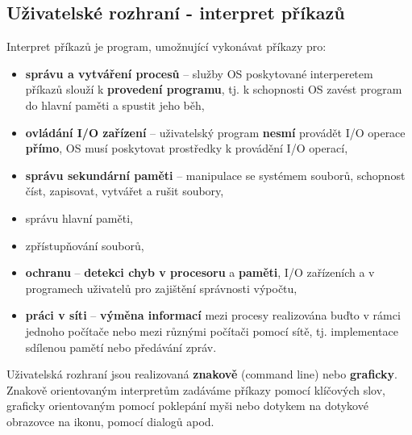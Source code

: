 \subsection{Uživatelské rozhraní - interpret příkazů}
Interpret příkazů je program, umožnující vykonávat příkazy pro:
\begin{itemize}
    \item \textbf{správu a vytváření procesů} -- služby OS poskytované interperetem příkazů slouží k \textbf{provedení programu}, tj. k schopnosti OS zavést program do hlavní paměti a spustit jeho běh,
    \item \textbf{ovládání I/O zařízení} -- uživatelský program \textbf{nesmí} provádět I/O operace \textbf{přímo}, OS musí poskytovat prostředky k provádění I/O operací,
    \item \textbf{správu sekundární paměti} -- manipulace se systémem souborů, schopnost číst, zapisovat, vytvářet a rušit soubory,
    \item správu hlavní paměti,
    \item zpřístupňování souborů,
    \item \textbf{ochranu} -- \textbf{detekci chyb v procesoru} a \textbf{paměti}, I/O zařízeních a v programech uživatelů pro zajištění správnosti výpočtu,
    \item \textbf{práci v síti} -- \textbf{výměna informací} mezi procesy realizována buďto v rámci jednoho počítače nebo mezi různými počítači pomocí sítě, tj. implementace sdílenou pamětí nebo předávání zpráv.
\end{itemize}
Uživatelská rozhraní jsou realizovaná \textbf{znakově} (command line) nebo \textbf{graficky}. Znakově orientovaným interpretům zadáváme příkazy pomocí klíčových slov, graficky orientovaným pomocí poklepání myši nebo dotykem na dotykové obrazovce na ikonu, pomocí dialogů apod.

